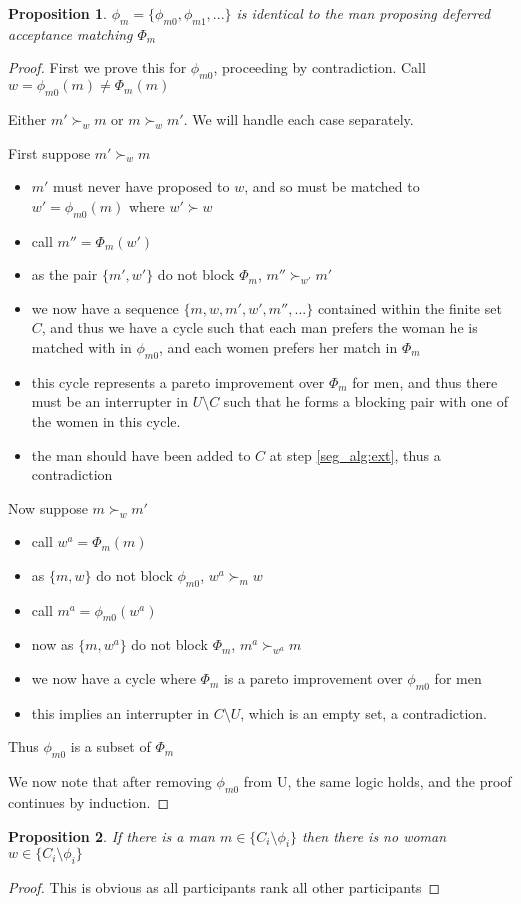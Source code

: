 \documentclass[WP]{AEA}
\newtheorem{prop}{Proposition}
\begin{document}
\begin{prop}
	$\phi_m = \{\phi_{m0}, \phi_{m1}, ...\}$ is identical to the man proposing deferred acceptance matching $\Phi_m $
\end{prop}
\begin{proof}
	First we prove this for $\phi_{m0}$, proceeding by contradiction.  Call $w = \phi_{m0}(m) \neq \Phi_m(m)$
	
	Either $m'\succ_w m$ or $m \succ_w m'$. We will handle each case separately.
	
	First suppose $m'\succ_w m$
	\begin{itemize}
		\item $m'$ must never have proposed to $w$, and so must be matched to $w' = \phi_{m0}(m)$ where $w' \succ w$
		\item call $m'' = \Phi_m (w')$
		\item as the pair $\{m', w'\}$ do not block $\Phi_m$, $m'' \succ_{w'} m'$
		\item we now have a sequence $\{m,w,m',w',m'',...\}$ contained within the finite set $C$, and thus we have a cycle such that each man prefers the woman he is matched with in  $\phi_{m0}$, and each women prefers her match in $\Phi_m$
		\item this cycle represents a pareto improvement over  $\Phi_m$ for men, and thus there must be an interrupter in $U \setminus C$ such that he forms a blocking pair with one of the women in this cycle. 
		\item the man should have been added to $C$ at step \ref*{seg_alg:ext}, thus a contradiction
	\end{itemize}
	Now suppose  $m \succ_w m'$
 	\begin{itemize}
 		\item call $w^a = \Phi_m(m)$
 		\item as $\{m,w\}$ do not block $\phi_{m0}$, $w^a \succ_{m} w$
 		\item call $m^a = \phi_{m0}(w^a)$
 		\item now as $\{m,w^a\}$ do not block $\Phi_m$, $m^a \succ_{w^a} m $
 		\item we now have a cycle where $\Phi_m$ is a pareto improvement over $\phi_{m0}$ for men
 		\item this implies an interrupter in $C \setminus U$, which is an empty set, a contradiction.
 	\end{itemize}
	Thus $\phi_{m0}$ is a subset of $\Phi_m$
	
We now note that after removing $\phi_{m0}$ from U, the same logic holds, and the proof continues by induction. 
\end{proof}
\begin{prop}
	If there is a man $m \in \{C_i  \setminus \phi_i\}$ then there is no woman $w \in \{C_i  \setminus \phi_i\}$
\end{prop}
\begin{proof}
	This is obvious as all participants rank all other participants
\end{proof}
	
\end{document}
